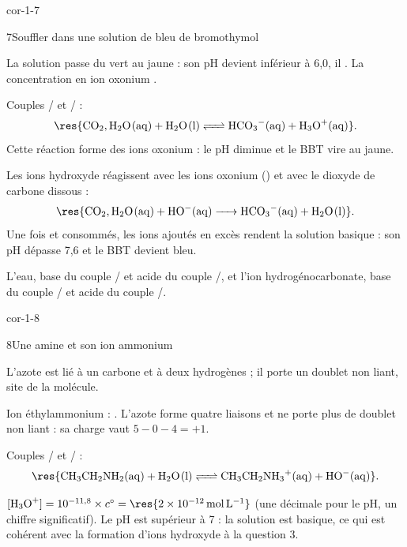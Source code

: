 \begin{blocLivre}{cor-1-7}
\begin{corrige}{7}{Souffler dans une solution de bleu de bromothymol}
\begin{questions}
\item La solution passe du vert au jaune : son pH devient inférieur à 6,0, il .
La concentration en ion oxonium .
\item Couples / et / :
\[\res{\ce{CO2,H2O(aq) + H2O(l) <=> HCO3^-(aq) + H3O^+(aq)}}.\]
Cette réaction forme des ions oxonium : le pH diminue et le BBT vire au jaune.
\item Les ions hydroxyde réagissent avec les ions oxonium () et avec le
dioxyde de carbone dissous :
\[\res{\ce{CO2,H2O(aq) + HO^-(aq) -> HCO3^-(aq) + H2O(l)}}.\]
Une fois  et  consommés, les ions  ajoutés en excès rendent la solution
basique : son pH dépasse 7,6 et le BBT devient bleu.
\item L'eau, base du couple / et acide du couple /, et l'ion
hydrogénocarbonate, base du couple / et acide du couple /.
\end{questions}
\end{corrige}
\end{blocLivre}
\begin{blocLivre}{cor-1-8}
\begin{corrige}{8}{Une amine et son ion ammonium}
\begin{questions}
\item L'azote est lié à un carbone et à deux hydrogènes ; il porte un doublet non liant, site
 de la molécule.
\item Ion éthylammonium : . L'azote forme quatre liaisons et ne porte plus de
doublet non liant : sa charge vaut $5-0-4=+1$.
\item Couples / et / :
\[\res{\ce{CH3CH2NH2(aq) + H2O(l) <=> CH3CH2NH3^+(aq) + HO^-(aq)}}.\]
\item $\hho=10^{-11{,}8}\times\cst=\res{\qty{2e-12}{mol.L^{-1}}}$ (une décimale pour le pH, un chiffre
significatif). Le pH est supérieur à 7 : la solution est basique, ce qui est cohérent avec la formation
d'ions hydroxyde à la question 3.
\end{questions}
\begin{center}
\hspace{14mm}
\par
{}
\end{center}
\end{corrige}
\end{blocLivre}
